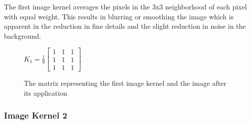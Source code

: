 \documentclass[12pt,letterpaper]{article}
\begin{document}
The first image kernel averages the pixels in the 3x3 neighborhood of each pixel with equal weight. This results in blurring or smoothing the image which is apparent in the reduction in fine details and the slight reduction in noise in the background.
\begin{figure}[ht]
\centering
$K_1 = \frac{1}{9} \begin{bmatrix}
1 & 1 & 1\\
1 & 1 & 1\\
1 & 1 & 1
\end{bmatrix}$
\hspace{2cm} 
\caption{\small{The matrix representing the first image kernel and the image after its application}
\label{fig:ker1} }
\end{figure}

\clearpage
\newpage

\subsubsection{Image Kernel 2}
\end{document}
